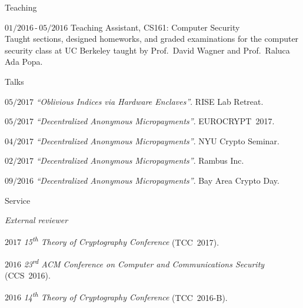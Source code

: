 \documentclass[11pt]{article}
\begin{document}
\begin{cv}{}
    \small
    \begin{bibunit}[alpha]
      \nocite{ChiesaGLMMM17, CarliniMVZSSWZ16, HoLMHSW16, PortnoffLEMLW15}
    \putbib[pubs]
    \end{bibunit}
  \begin{cvlist}{Teaching}
  \item[\small$01/2016$\,-\,$05/2016$] Teaching Assistant, \textsc{CS161}: Computer Security\\
    {\small
    Taught sections, designed homeworks, and graded examinations for the computer security class at UC Berkeley taught by Prof.~David Wagner and Prof.~Raluca Ada Popa.}
  \end{cvlist}
  \begin{cvlist}{Talks}
    \small
  \item[\small$05/2017$] \emph{``Oblivious Indices via Hardware Enclaves''}. RISE Lab Retreat.
  \item[\small$05/2017$] \emph{``Decentralized Anonymous Micropayments''}. EUROCRYPT~2017.
  \item[\small$04/2017$] \emph{``Decentralized Anonymous Micropayments''}. NYU Crypto Seminar.
  \item[\small$02/2017$] \emph{``Decentralized Anonymous Micropayments''}. Rambus Inc.
  \item[\small$09/2016$] \emph{``Decentralized Anonymous Micropayments''}. Bay Area Crypto Day.
  \end{cvlist}
  \begin{cvlist}{Service}
    \small
  \item[\emph{External reviewer}]
  \item[\small $2017$] \emph{15\textsuperscript{th} Theory of Cryptography Conference} (TCC~2017).
  \item[\small $2016$] \emph{23\textsuperscript{rd} ACM Conference on Computer and Communications Security} (CCS~2016).
  \item[\small $2016$] \emph{14\textsuperscript{th} Theory of Cryptography Conference} (TCC~2016-B).
  \end{cvlist}
\end{cv}
\end{document}
